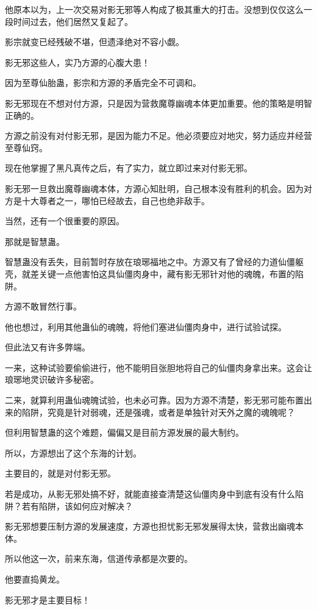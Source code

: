 \begin{this_body}
他原本以为，上一次交易对影无邪等人构成了极其重大的打击。没想到仅仅这么一段时间过去，他们居然又复起了。

影宗就变已经残破不堪，但遗泽绝对不容小觑。

影无邪这些人，实乃方源的心腹大患！

因为至尊仙胎蛊，影宗和方源的矛盾完全不可调和。

影无邪现在不想对付方源，只是因为营救魔尊幽魂本体更加重要。他的策略是明智正确的。

方源之前没有对付影无邪，是因为能力不足。他必须要应对地灾，努力适应并经营至尊仙窍。

现在他掌握了黑凡真传之后，有了实力，就立即过来对付影无邪。

影无邪一旦救出魔尊幽魂本体，方源心知肚明，自己根本没有胜利的机会。因为对方是十大尊者之一，哪怕已经故去，自己也绝非敌手。

当然，还有一个很重要的原因。

那就是智慧蛊。

智慧蛊没有丢失，目前暂时存放在琅琊福地之中。方源又有了曾经的力道仙僵躯壳，就差关键一点他害怕这具仙僵肉身中，藏有影无邪针对他的魂魄，布置的陷阱。

方源不敢冒然行事。

他也想过，利用其他蛊仙的魂魄，将他们塞进仙僵肉身中，进行试验试探。

但此法又有许多弊端。

一来，这种试验要偷偷进行，他不能明目张胆地将自己的仙僵肉身拿出来。这会让琅琊地灵识破许多秘密。

二来，就算利用蛊仙魂魄试验，也未必可靠。因为方源不清楚，影无邪可能布置出来的陷阱，究竟是针对弱魂，还是强魂，或者是单独针对天外之魔的魂魄呢？

但利用智慧蛊的这个难题，偏偏又是目前方源发展的最大制约。

所以，方源想出了这个东海的计划。

主要目的，就是对付影无邪。

若是成功，从影无邪处搞不好，就能直接查清楚这仙僵肉身中到底有没有什么陷阱？若有陷阱，该如何应对解决？

影无邪想要压制方源的发展速度，方源也担忧影无邪发展得太快，营救出幽魂本体。

所以他这一次，前来东海，信道传承都是次要的。

他要直捣黄龙。

影无邪才是主要目标！

\end{this_body}

